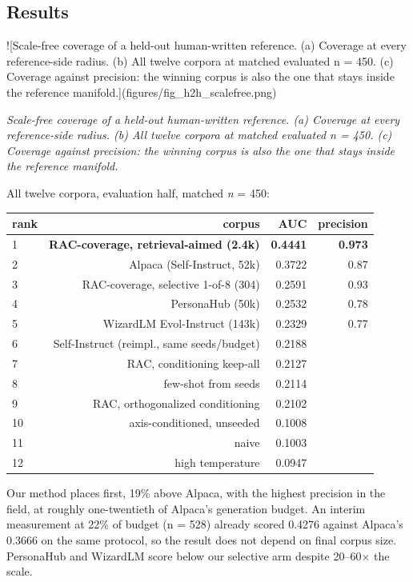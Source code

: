 \documentclass[11pt]{article}
\theoremstyle{plain}
\theoremstyle{definition}
\begin{document}
\subsection{Results}
![Scale-free coverage of a held-out human-written reference. (a) Coverage at every reference-side radius. (b) All twelve corpora at matched evaluated n = 450. (c) Coverage against precision: the winning corpus is also the one that stays inside the reference manifold.](figures/fig\_h2h\_scalefree.png)

\emph{Scale-free coverage of a held-out human-written reference. (a) Coverage at every reference-side radius. (b) All twelve corpora at matched evaluated n = 450. (c) Coverage against precision: the winning corpus is also the one that stays inside the reference manifold.}

All twelve corpora, evaluation half, matched \emph{n} = 450:

\begin{table}[htbp]
\centering
\small
\begin{tabular}{lrrr}
\toprule
\textbf{rank} & \textbf{corpus} & \textbf{AUC} & \textbf{precision} \\
\midrule
1 & \textbf{RAC-coverage, retrieval-aimed (2.4k)} & \textbf{0.4441} & \textbf{0.973} \\
2 & Alpaca (Self-Instruct, 52k) & 0.3722 & 0.87 \\
3 & RAC-coverage, selective 1-of-8 (304) & 0.2591 & 0.93 \\
4 & PersonaHub (50k) & 0.2532 & 0.78 \\
5 & WizardLM Evol-Instruct (143k) & 0.2329 & 0.77 \\
6 & Self-Instruct (reimpl., same seeds/budget) & 0.2188 &  \\
7 & RAC, conditioning keep-all & 0.2127 &  \\
8 & few-shot from seeds & 0.2114 &  \\
9 & RAC, orthogonalized conditioning & 0.2102 &  \\
10 & axis-conditioned, unseeded & 0.1008 &  \\
11 & naive & 0.1003 &  \\
12 & high temperature & 0.0947 &  \\
\bottomrule
\end{tabular}
\end{table}

Our method places first, 19\% above Alpaca, with the highest precision in the field, at roughly one-twentieth of Alpaca's generation budget. An interim measurement at 22\% of budget (n = 528) already scored 0.4276 against Alpaca's 0.3666 on the same protocol, so the result does not depend on final corpus size. PersonaHub and WizardLM score below our selective arm despite 20--60$\times$ the scale.
\end{document}
